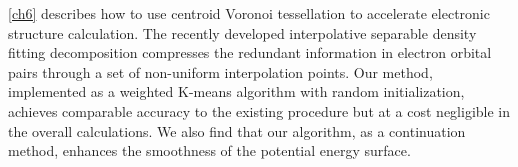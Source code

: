 \cref{ch6} describes how to use centroid Voronoi tessellation to accelerate
electronic structure calculation. The recently developed interpolative separable
density fitting decomposition compresses the redundant information in electron
orbital pairs through a set of non\hyp{}uniform interpolation points. Our
method, implemented as a weighted K-means algorithm with random initialization,
achieves comparable accuracy to the existing procedure but at a cost negligible
in the overall calculations. We also find that our algorithm, as a continuation
method, enhances the smoothness of the potential energy surface.